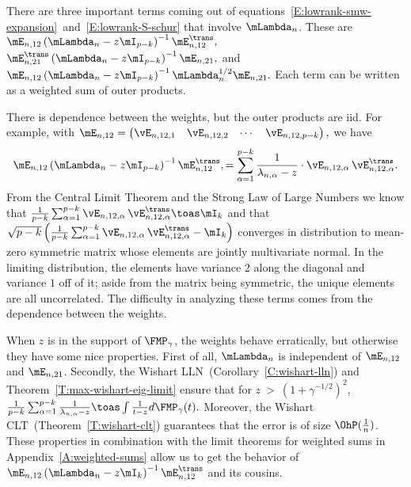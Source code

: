 There are three important terms coming out of equations~\eqref{E:lowrank-smw-expansion}~and~\eqref{E:lowrank-S-schur} that involve $\mLambda_n$.  These are
\(
    \mE_{n,12}
    \left(
        \mLambda_n - z \mI_{p-k}
    \right)^{-1}
    \mE_{n,12}^\trans,
\)
\(
    \mE_{n,21}^\trans
    \left(
        \mLambda_n - z \mI_{p-k}
    \right)^{-1}
    \mE_{n,21},
\)
and
\(
    \mE_{n,12}
    \left(
        \mLambda_n - z \mI_{p-k}
    \right)^{-1}
    \mLambda_n^{1/2}
    \mE_{n,21}.
\)
Each term can be written as a weighted sum of outer products.  

There is
dependence between the weights, but the outer products are iid.  For example,
with
\(
    \mE_{n,12}
    =
    \left(
    \begin{matrix}
        \vE_{n,12,1} &
        \vE_{n,12,2} &
        \cdots &
        \vE_{n,12,p-k}
    \end{matrix}
    \right),
\) 
we have
\[
    \mE_{n,12}
    \left(
        \mLambda_n - z \mI_{p-k}
    \right)^{-1}
    \mE_{n,12}^\trans,
        =
            \sum_{\alpha=1}^{p-k}
                \frac{1}{\lambda_{n,\alpha} - z}
                \cdot
                \vE_{n,12,\alpha} \,
                \vE_{n,12,\alpha}^\trans.
\]
From the Central Limit Theorem and the Strong Law of Large Numbers
we know that
\(
    \frac{1}{p-k}
    \sum_{\alpha=1}^{p-k}
        \vE_{n,12,\alpha} \,
        \vE_{n,12,\alpha}^\trans
        \toas
            \mI_{k}
\)
and that
\(
    \sqrt{p-k}
    \left(
        \frac{1}{p-k}
        \sum_{\alpha=1}^{p-k}
            \vE_{n,12,\alpha} \,
            \vE_{n,12,\alpha}^\trans
        -
        \mI_{k}
    \right)
\)
converges in distribution to mean-zero symmetric matrix whose elements are jointly multivariate normal.  In the limiting distribution, the elements have variance $2$ along the diagonal and variance $1$ off of it; aside from the matrix being symmetric, the unique elements are all uncorrelated.  The
difficulty in analyzing these terms comes from the dependence between 
the weights.

When $z$ is in the support of $\FMP_\gamma$, the weights behave
erratically, but otherwise they have some nice properties.
First of all, $\mLambda_n$ is independent of $\mE_{n,12}$ and $\mE_{n,21}$.
Secondly, the Wishart LLN~(Corollary~\ref{C:wishart-lln}) and
Theorem~\ref{T:max-wishart-eig-limit} ensure that for
$z~>~(1+\gamma^{-1/2})^2$,
\(
    \frac{1}{p-k}
    \sum_{\alpha=1}^{p-k}
        \frac{1}{\lambda_{n,\alpha} - z}
    \toas
    \int
        \frac{1}{t - z}
        d\FMP_\gamma(t).
\)
Moreover, the Wishart CLT~(Theorem~\ref{T:wishart-clt}) guarantees that
the error is of size $\OhP(\frac{1}{n})$.  These properties in
combination with the limit theorems for weighted sums in 
Appendix~\ref{A:weighted-sums} allow us to get the behavior of
\(
    \mE_{n,12}
    \left(
        \mLambda_n
        -
        z
        \mI_k
    \right)^{-1}
    \mE_{n,12}^\trans
\)
and its cousins.

